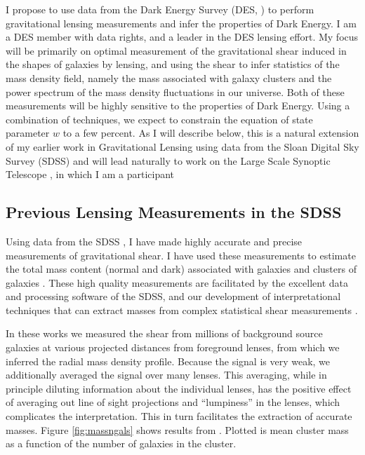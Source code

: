 \documentclass[12pt]{article}
\begin{document}
I propose to use data from the Dark Energy Survey (DES, \cite{DESWhitePaper})
to perform gravitational lensing measurements and infer the properties of Dark
Energy.  I am a DES member with data rights, and a leader in the DES lensing
effort.  My focus will be primarily on optimal measurement of the gravitational
shear induced in the shapes of galaxies by lensing, and using the shear to
infer statistics of the mass density field, namely the mass associated with
galaxy clusters and the power spectrum of the mass density fluctuations in our
universe. Both of these measurements will be highly sensitive to the properties
of Dark Energy.  Using a combination of techniques, we expect to constrain the
equation of state parameter $w$ to a few percent.  As I will describe below,
this is a natural extension of my earlier work in Gravitational Lensing using
data from the Sloan Digital Sky Survey (SDSS) and will lead naturally to work
on the Large Scale Synoptic Telescope \cite{lsstweb}, in which I am a
participant 

\subsection{Previous Lensing Measurements in the SDSS} \label{sec:sdssold}

Using data from the SDSS \cite{York00}, I have made highly accurate and precise
measurements of gravitational shear. I have used these measurements to estimate
the total mass content (normal and dark) associated with galaxies and clusters
of galaxies
\cite{fis00,Sheldon04,SheldonLensing07,JohnstonLensing07,SheldonM2L07}.  These
high quality measurements are facilitated by the excellent data and processing
software of the SDSS, and our development of interpretational techniques that
can extract masses from complex statistical shear measurements
\cite{JohnstonInvert07}.

In these works we measured the shear from millions of background source
galaxies at various projected distances from foreground lenses, from which we
inferred the radial mass density profile.  Because the signal is very weak, we
additionally averaged the signal over many lenses.  This averaging, while in
principle diluting information about the individual lenses, has the positive
effect of averaging out line of sight projections and ``lumpiness'' in the
lenses, which complicates the interpretation.  This in turn facilitates the
extraction of accurate masses.  Figure \ref{fig:massngals} shows results
from \cite{SheldonLensing07,JohnstonLensing07}. Plotted is mean cluster mass as
a function of the number of galaxies in the cluster.  
\end{document}
